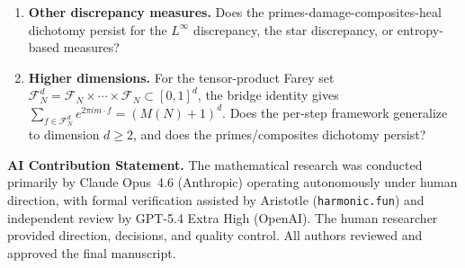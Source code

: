 \documentclass[11pt]{article}
\theoremstyle{definition}
\newcommand{\F}{\mathcal{F}}
\begin{document}
\begin{enumerate}
  \item \textbf{Other discrepancy measures.}
    Does the primes-damage-composites-heal dichotomy persist for
    the $L^{\infty}$ discrepancy, the star discrepancy, or
    entropy-based measures?

  \item \textbf{Higher dimensions.}
    For the tensor-product Farey set
    $\F_N^d = \F_N \times \cdots \times \F_N \subset [0,1]^d$,
    the bridge identity gives
    $\sum_{f \in \F_N^d} e^{2\pi i m \cdot f} = (M(N)+1)^d$.
    Does the per-step framework generalize to dimension $d \ge 2$,
    and does the primes/composites dichotomy persist?
\end{enumerate}



\bigskip
\noindent\textbf{AI Contribution Statement.}
The mathematical research was conducted primarily by Claude
Opus~4.6 (Anthropic) operating autonomously under human direction,
with formal verification assisted by Aristotle (\texttt{harmonic.fun})
and independent review by GPT-5.4 Extra High (OpenAI).  The human
researcher provided direction, decisions, and quality control.
All authors reviewed and approved the final manuscript.
\end{document}
